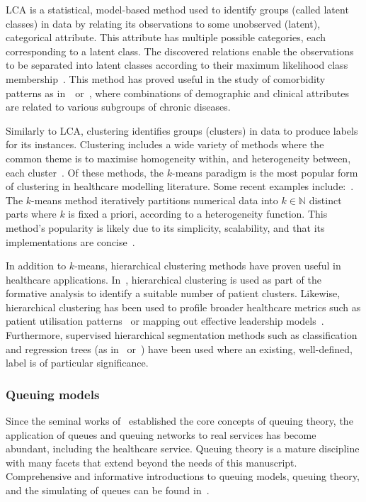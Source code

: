 \documentclass[]{interact}
\theoremstyle{plain}%
\theoremstyle{definition}
\theoremstyle{remark}
\begin{document}
LCA is a statistical, model-based method used to identify groups (called latent
classes) in data by relating its observations to some unobserved (latent),
categorical attribute. This attribute has multiple possible categories, each
corresponding to a latent class. The discovered relations enable the
observations to be separated into latent classes according to their maximum
likelihood class membership~\citep{Hagenaars2002,Lazarsfeld1968}. This method
has proved useful in the study of comorbidity patterns as
in~\cite{Kuwornu2014}~or~\cite{Larsen2017}, where combinations of demographic
and clinical attributes are related to various subgroups of chronic diseases.

Similarly to LCA, clustering identifies groups (clusters) in data to produce
labels for its instances. Clustering includes a wide variety of methods
where the common theme is to maximise homogeneity within, and heterogeneity
between, each cluster~\citep{Everitt2011}. Of these methods, the \(k\)-means
paradigm is the most popular form of clustering in healthcare modelling
literature. Some recent examples include:~\cite{%
    Elbattah2017,Haraty2015,Ogbuabor2018,Santhi2010,Silitonga2018,Vuik2016a%
}. The \(k\)-means method iteratively partitions numerical data into
\(k \in \mathbb N\) distinct parts where \(k\) is fixed a priori, according to a
heterogeneity function. This method's popularity is likely due to its
simplicity, scalability, and that its implementations are
concise~\citep{Olafsson2008,Wu2009}.

In addition to \(k\)-means, hierarchical clustering methods have proven useful
in healthcare applications. In~\cite{Vuik2016a}, hierarchical clustering is used
as part of the formative analysis to identify a suitable number of patient
clusters. Likewise, hierarchical clustering has been used to profile broader
healthcare metrics such as patient utilisation patterns~\citep{Zayas2016} or
mapping out effective leadership models~\cite{Hargett2017}. Furthermore,
supervised hierarchical segmentation methods such as classification and
regression trees (as in~\cite{Harper2006} or~\cite{Kumar2019}) have been used
where an existing, well-defined, label is of particular significance.

\subsubsection{Queuing models}

Since the seminal works of~\cite{Erlang1917,Erlang1920} established the
core concepts of queuing theory, the application of queues and queuing networks
to real services has become abundant, including the healthcare service. Queuing
theory is a mature discipline with many facets that extend beyond the needs of
this manuscript. Comprehensive and informative introductions to queuing models,
queuing theory, and the simulating of queues can be found
in~\citep{Bhat2015,Shortle2018,Stewart2009}.
\end{document}
